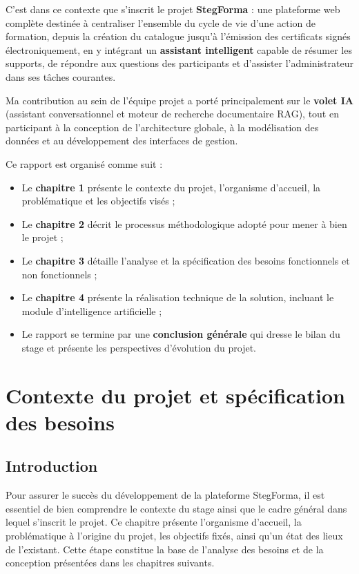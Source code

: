 \documentclass[12pt,a4paper,oneside,openany]{report}
\begin{document}
C'est dans ce contexte que s'inscrit le projet \textbf{StegForma} : une plateforme web complète destinée à centraliser l'ensemble du cycle de vie d'une action de formation, depuis la création du catalogue jusqu'à l'émission des certificats signés électroniquement, en y intégrant un \textbf{assistant intelligent} capable de résumer les supports, de répondre aux questions des participants et d'assister l'administrateur dans ses tâches courantes.

Ma contribution au sein de l'équipe projet a porté principalement sur le \textbf{volet IA} (assistant conversationnel et moteur de recherche documentaire RAG), tout en participant à la conception de l'architecture globale, à la modélisation des données et au développement des interfaces de gestion.

Ce rapport est organisé comme suit :
\begin{itemize}[label=\textbullet]
    \item Le \textbf{chapitre 1} présente le contexte du projet, l'organisme d'accueil, la problématique et les objectifs visés ;
    \item Le \textbf{chapitre 2} décrit le processus méthodologique adopté pour mener à bien le projet ;
    \item Le \textbf{chapitre 3} détaille l'analyse et la spécification des besoins fonctionnels et non fonctionnels ;
    \item Le \textbf{chapitre 4} présente la réalisation technique de la solution, incluant le module d'intelligence artificielle ;
    \item Le rapport se termine par une \textbf{conclusion générale} qui dresse le bilan du stage et présente les perspectives d'évolution du projet.
\end{itemize}

\chapter[Contexte du projet]{Contexte du projet et spécification des besoins}

\section*{Introduction}
\hrulefill

Pour assurer le succès du développement de la plateforme StegForma, il est essentiel de bien comprendre le contexte du stage ainsi que le cadre général dans lequel s'inscrit le projet. Ce chapitre présente l'organisme d'accueil, la problématique à l'origine du projet, les objectifs fixés, ainsi qu'un état des lieux de l'existant. Cette étape constitue la base de l'analyse des besoins et de la conception présentées dans les chapitres suivants.
\end{document}
